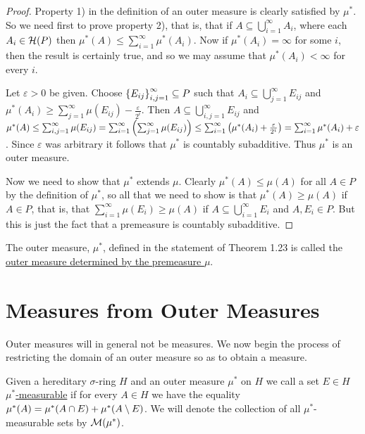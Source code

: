 \begin{proof}
Property 1) in the definition of an outer measure is clearly satisfied by $\mu^*$. So we need first to prove property 2), that is, that if $A\subseteq\bigcup_{i=1}^\infty A_i$, where each $A_i\in{\cal H}(P)$ then $\mu^*(A)\leq\sum_{i=1}^\infty \mu^*(A_i)$. Now if $\mu^*(A_i)=\infty$ for some $i$, then the result is certainly true, and so we may assume that $\mu^*(A_i)<\infty$ for every $i$.

Let $\varepsilon>0$ be given. Choose $\left\{E_{ij}\right\}_{i, j=1}^\infty\subseteq P$ such that $A_i\subseteq\bigcup_{j=1}^\infty E_{ij}$ and $\mu^*(A_i)\geq\sum_{j=1}^\infty\mu(E_{ij})-\frac{\varepsilon}{2^i}$. Then $A\subseteq\bigcup_{i,j=1}^\infty E_{i j}$ and $\mu^*(A)\leq\sum_{i,j=1}^\infty\mu(E_{ij})=\sum_{i=1}^\infty\left(\sum_{j=1}^\infty\mu(E_{i j})\right)\leq \sum_{i=1}^\infty\left(\mu^*(A_i)+\frac{\varepsilon}{2^i}\right)=\sum_{i=1}^\infty\mu^*(A_i)+\varepsilon$. Since $\varepsilon$ was arbitrary it follows that $\mu^*$ is countably subadditive. Thus $\mu^*$ is an outer measure.

Now we need to show that $\mu^*$ extends $\mu$. Clearly $\mu^*(A)\leq\mu(A)$ for all $A\in P$ by the definition of $\mu^*$, so all that we need to show is that $\mu^*(A)\geq\mu(A)$ if $A\in P$, that is, that $\sum_{i=1}^\infty\mu(E_i)\geq\mu(A)$ if $A\subseteq \bigcup_{i=1}^\infty E_i$ and $A, E_i \in P$. But this is just the fact that a premeasure is countably subadditive.
\end{proof}

\begin{definition}
The outer measure, $\mu^*$, defined in the statement of Theorem 1.23 is called the \underline{outer measure determined by the premeasure $\mu$}.
\end{definition}

\section{Measures from Outer Measures}

Outer measures will in general not be measures. We now begin the process of restricting the domain of an outer measure so as to obtain a measure.

\begin{definition}
Given a hereditary $\sigma$-ring $H$ and an outer measure $\mu^*$ on $H$ we call a set $E\in H$ \underline{$\mu^*$-measurable} if for every $A\in H$ we have the equality $\mu^*(A)=\mu^*(A\cap E)+\mu^*(A\setminus E)$. We will denote the collection of all $\mu^*$-measurable sets by ${\cal M}(\mu^*)$.
\end{definition}

